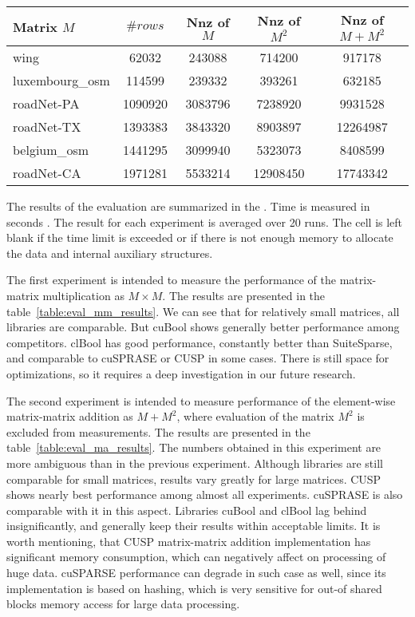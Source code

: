 {\setlength{\tabcolsep}{0.3em}
\begin{table}
\centering
{
\caption{}
\label{table:sparse_matrices}
\scriptsize
{}
\begin{tabular}{|l|c|c|c|c|}
\hline
Matrix $M$      & $\# rows$  & Nnz of $M$   & Nnz of $M^2$  & Nnz of $M + M^2$ \\
\hline
\hline
wing            & 62032      & 243088       & 714200        & 917178            \\
luxembourg\_osm & 114599     & 239332       & 393261        & 632185            \\
roadNet-PA      & 1090920    & 3083796      & 7238920       & 9931528           \\
roadNet-TX      & 1393383    & 3843320      & 8903897       & 12264987          \\
belgium\_osm    & 1441295    & 3099940      & 5323073       & 8408599           \\
roadNet-CA      & 1971281    & 5533214      & 12908450      & 17743342          \\

\hline
\end{tabular}
}
\end{table}
}

The results of the evaluation are summarized in the .
Time is measured in seconds .
The result for each experiment is averaged over 20 runs.
The cell is left blank if the time limit is exceeded or if there is not enough memory to allocate the data and internal auxiliary structures.

The first experiment is intended to measure the performance of the matrix-matrix multiplication as $M \times M$.
The results are presented in the table~\ref{table:eval_mm_results}.
We can see that for relatively small matrices, all libraries are comparable.
But cuBool shows generally better performance among competitors.
clBool has good performance, constantly better than SuiteSparse, and comparable to cuSPRASE or CUSP in some cases.
There is still space for optimizations, so it requires a deep investigation in our future research.

The second experiment is intended to measure performance of the element-wise matrix-matrix addition as $M + M^2$,
where evaluation of the matrix $M^2$ is excluded from measurements.
The results are presented in the table~\ref{table:eval_ma_results}.
The numbers obtained in this experiment are more ambiguous than in the previous experiment.
Although libraries are still comparable for small matrices, results vary greatly for large matrices.
CUSP shows nearly best performance among almost all experiments.
cuSPRASE is also comparable with it in this aspect.
Libraries cuBool and clBool lag behind insignificantly, and generally keep their results within acceptable limits.
It is worth mentioning, that CUSP matrix-matrix addition implementation has significant memory consumption, which can negatively affect on processing of huge data.
cuSPARSE performance can degrade in such case as well, since its implementation is based on hashing, which is very sensitive for out-of shared blocks memory access for large data processing.

